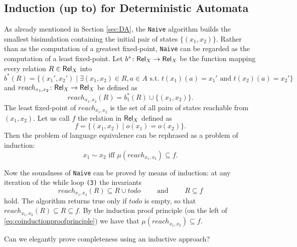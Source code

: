 \documentclass[smallcondensed,envcountsect,envcountsame]{svjour3}     %
\begin{document}

\subsection{Induction (up to) for Deterministic Automata}
%
As already mentioned in Section \ref{sec:DA}, the \texttt{Naive} algorithm builds the smallest bisimulation containing the initial pair of states $\{(x_1,x_2)\}$. Rather than as the computation of a greatest fixed-point, \texttt{Naive} can be regarded as the computation of a least fixed-point.
Let $b^*\colon \mathsf{Rel}_X \to \mathsf{Rel}_X$ be the function mapping every relation $R\in \mathsf{Rel}_X$ into
\begin{equation}\label{eq:bstarDA}
b^*(R) = \{(x_1',x_2') \mid \exists (x_1,x_2)\in R, a\in A \text{ s.t. }  t(x_1)(a)=x_1' \text{ and } t(x_2)(a)=x_2' \}
\end{equation}
and $reach_{x_1,x_2}\colon \mathsf{Rel}_X \to \mathsf{Rel}_X$ be defined as 
$$reach_{x_1,x_2}(R) = b_1^*(R) \cup \{(x_1,x_2)\}\text{.}$$
The least fixed-point of $reach_{x_1,x_2}$ is the set of all pairs of states reachable from $(x_1,x_2)$.
Let us call $f$ the relation in $\mathsf{Rel}_X$ defined as 
\begin{equation}\label{eq:fDA}
f=\{(x_1,x_2)  \mid o(x_1)=o(x_2) \}\text{.}
\end{equation}
Then the problem of language equivalence can be rephrased as a problem of induction:
$$x_1\sim x_2 \text{ iff } \mu (reach_{x_1,x_2}) \subseteq f\text{.}$$

Now the soundness of \texttt{Naive} can be proved by means of induction: at any iteration of the while loop \texttt{(3)} the invariants
$$reach_{x_1,x_2}(R) \subseteq R\cup todo \qquad \text{ and } \qquad R\subseteq f$$
hold. The algorithm returns true only if $todo$ is empty, so that $reach_{x_1,x_2}(R) \subseteq R \subseteq f$. By the induction proof principle (on the left of \eqref{eq:coinductionproofprinciple}) we have that  $\mu (reach_{x_1,x_2}) \subseteq f$.
\begin{question} 
Can we elegantly prove completeness using an inductive approach?
\end{question}
\end{document}
